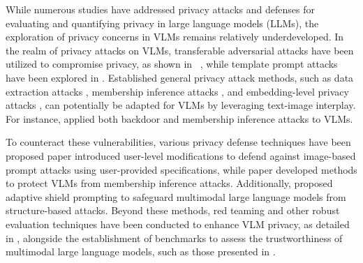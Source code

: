 
While numerous studies have addressed privacy attacks and defenses for evaluating and quantifying privacy in large language models (LLMs), the exploration of privacy concerns in VLMs remains relatively underdeveloped. In the realm of privacy attacks on VLMs, transferable adversarial attacks have been utilized to compromise privacy, as shown in ~\cite{wang2024transferable, cui2024robustness}, while template prompt attacks have been explored in \cite{wu2024quantifying, ashcroft2024evaluation}. Established general privacy attack methods, such as data extraction attacks \cite{carlini2021extracting}, membership inference attacks \cite{Shokri2016MembershipIA}, and embedding-level privacy attacks \cite{10.1145/3372297.3417270}, can potentially be adapted for VLMs by leveraging text-image interplay. For instance, \cite{wen2024privacy} applied both backdoor and membership inference attacks to VLMs.

To counteract these vulnerabilities, various privacy defense techniques have been proposed paper \cite{sharma2024defending} introduced user-level modifications to defend against image-based prompt attacks using user-provided specifications, while paper \cite{amit2024sok} developed methods to protect VLMs from membership inference attacks. Additionally, \cite{wang2024adashield} proposed adaptive shield prompting to safeguard multimodal large language models from structure-based attacks. Beyond these methods, red teaming and other robust evaluation techniques have been conducted to enhance VLM privacy, as detailed in \cite{li2024red}, alongside the establishment of benchmarks to assess the trustworthiness of multimodal large language models, such as those presented in \cite{zhang2024benchmarkingtrustworthinessmultimodallarge}.

